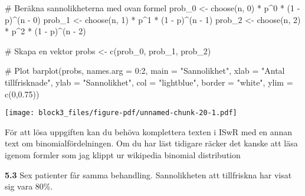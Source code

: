 \documentclass[
  letterpaper,
  DIV=11,
  numbers=noendperiod]{scrartcl}
\newenvironment{Shaded}{\begin{snugshade}}{\end{snugshade}}
\newcommand{\AttributeTok}[1]{\textcolor[rgb]{0.40,0.45,0.13}{#1}}
\newcommand{\CommentTok}[1]{\textcolor[rgb]{0.37,0.37,0.37}{#1}}
\newcommand{\DecValTok}[1]{\textcolor[rgb]{0.68,0.00,0.00}{#1}}
\newcommand{\FloatTok}[1]{\textcolor[rgb]{0.68,0.00,0.00}{#1}}
\newcommand{\FunctionTok}[1]{\textcolor[rgb]{0.28,0.35,0.67}{#1}}
\newcommand{\NormalTok}[1]{\textcolor[rgb]{0.00,0.23,0.31}{#1}}
\newcommand{\OtherTok}[1]{\textcolor[rgb]{0.00,0.23,0.31}{#1}}
\newcommand{\SpecialCharTok}[1]{\textcolor[rgb]{0.37,0.37,0.37}{#1}}
\newcommand{\StringTok}[1]{\textcolor[rgb]{0.13,0.47,0.30}{#1}}
\begin{document}
\begin{Shaded}
\begin{Highlighting}[]
\CommentTok{\# Beräkna sannolikheterna med ovan formel}
\NormalTok{prob\_0 }\OtherTok{\textless{}{-}} \FunctionTok{choose}\NormalTok{(n, }\DecValTok{0}\NormalTok{) }\SpecialCharTok{*}\NormalTok{ p}\SpecialCharTok{\^{}}\DecValTok{0} \SpecialCharTok{*}\NormalTok{ (}\DecValTok{1} \SpecialCharTok{{-}}\NormalTok{ p)}\SpecialCharTok{\^{}}\NormalTok{(n }\SpecialCharTok{{-}} \DecValTok{0}\NormalTok{)}
\NormalTok{prob\_1 }\OtherTok{\textless{}{-}} \FunctionTok{choose}\NormalTok{(n, }\DecValTok{1}\NormalTok{) }\SpecialCharTok{*}\NormalTok{ p}\SpecialCharTok{\^{}}\DecValTok{1} \SpecialCharTok{*}\NormalTok{ (}\DecValTok{1} \SpecialCharTok{{-}}\NormalTok{ p)}\SpecialCharTok{\^{}}\NormalTok{(n }\SpecialCharTok{{-}} \DecValTok{1}\NormalTok{)}
\NormalTok{prob\_2 }\OtherTok{\textless{}{-}} \FunctionTok{choose}\NormalTok{(n, }\DecValTok{2}\NormalTok{) }\SpecialCharTok{*}\NormalTok{ p}\SpecialCharTok{\^{}}\DecValTok{2} \SpecialCharTok{*}\NormalTok{ (}\DecValTok{1} \SpecialCharTok{{-}}\NormalTok{ p)}\SpecialCharTok{\^{}}\NormalTok{(n }\SpecialCharTok{{-}} \DecValTok{2}\NormalTok{)}

\CommentTok{\# Skapa en vektor}
\NormalTok{probs }\OtherTok{\textless{}{-}} \FunctionTok{c}\NormalTok{(prob\_0, prob\_1, prob\_2)}

\CommentTok{\# Plot}
\FunctionTok{barplot}\NormalTok{(probs, }\AttributeTok{names.arg =} \DecValTok{0}\SpecialCharTok{:}\DecValTok{2}\NormalTok{, }\AttributeTok{main =} \StringTok{"Sannolikhet"}\NormalTok{, }\AttributeTok{xlab =} \StringTok{"Antal tillfrisknade"}\NormalTok{, }\AttributeTok{ylab =} \StringTok{"Sannolikhet"}\NormalTok{, }\AttributeTok{col =} \StringTok{"lightblue"}\NormalTok{, }\AttributeTok{border =} \StringTok{"white"}\NormalTok{, }\AttributeTok{ylim =} \FunctionTok{c}\NormalTok{(}\DecValTok{0}\NormalTok{,}\FloatTok{0.75}\NormalTok{))}
\end{Highlighting}
\end{Shaded}

\texttt{[image: block3\_files/figure-pdf/unnamed-chunk-20-1.pdf]}

För att lösa uppgiften kan du behöva komplettera texten i ISwR med en
annan text om binomialfördelningen. Om du har läst tidigare räcker det
kanske att läsa igenom formler som jag klippt ur wikipedia binomial
distribution

\textbf{5.3} Sex patienter får samma behandling. Sannolikheten att
tillfriskna har visat sig vara 80\%.
\end{document}
